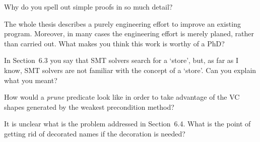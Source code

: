 \Q Why do you spell out simple proofs in so much detail?

\Q The whole thesis describes a purely engineering effort to improve an
existing program. Moreover, in many cases the engineering effort is merely
planed, rather than carried out. What makes you think this work is worthy
of a PhD?

\Q In Section~6.3 you say that SMT solvers search for a `store', but, as
far as I know, SMT solvers are not familiar with the concept of a `store'.
Can you explain what you meant?

\Q How would a {\it prune\/} predicate look like in order to take advantage
of the VC shapes generated by the weakest precondition method?

\Q It is unclear what is the problem addressed in Section~6.4. What is the
point of getting rid of decorated names if the decoration is needed?


\bye
